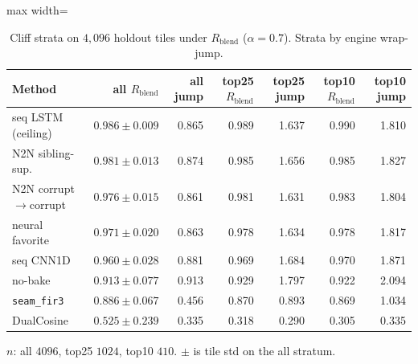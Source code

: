 \begin{table}[htbp]
  \centering
  \caption{Cliff strata on $4{,}096$ holdout tiles under $R_{\mathrm{blend}}$ ($\alpha{=}0.7$). Strata by engine wrap-jump.}
  \label{tab:cliff-strata}
  \setlength{\tabcolsep}{2.5pt}
  \begin{adjustbox}{max width=\textwidth}
\begin{tabular}{@{}lrrrrrr@{}}
    \toprule
    Method & all $R_{\mathrm{blend}}$ & all jump & top25 $R_{\mathrm{blend}}$ & top25 jump & top10 $R_{\mathrm{blend}}$ & top10 jump \\
    \midrule
    seq LSTM (ceiling) & $0.986\pm0.009$ & 0.865 & 0.989 & 1.637 & 0.990 & 1.810 \\
    N2N sibling-sup. & $0.981\pm0.013$ & 0.874 & 0.985 & 1.656 & 0.985 & 1.827 \\
    N2N corrupt$\to$corrupt & $0.976\pm0.015$ & 0.861 & 0.981 & 1.631 & 0.983 & 1.804 \\
    neural favorite & $0.971\pm0.020$ & 0.863 & 0.978 & 1.634 & 0.978 & 1.817 \\
    seq CNN1D & $0.960\pm0.028$ & 0.881 & 0.969 & 1.684 & 0.970 & 1.871 \\
    no-bake & $0.913\pm0.077$ & 0.913 & 0.929 & 1.797 & 0.922 & 2.094 \\
    \texttt{seam\_fir3} & $0.886\pm0.067$ & 0.456 & 0.870 & 0.893 & 0.869 & 1.034 \\
    DualCosine & $0.525\pm0.239$ & 0.335 & 0.318 & 0.290 & 0.305 & 0.335 \\
    \bottomrule
  \end{tabular}
\end{adjustbox}

  \vspace{0.5em}
  {\footnotesize $n$: all $4096$, top25 $1024$, top10 $410$. $\pm$ is tile std on the all stratum.}
  \vspace{1.2em}
\end{table}


